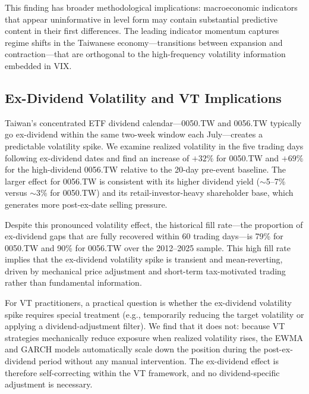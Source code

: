 This finding has broader methodological implications: macroeconomic indicators that appear uninformative in level form may contain substantial predictive content in their first differences. The leading indicator momentum captures regime shifts in the Taiwanese economy---transitions between expansion and contraction---that are orthogonal to the high-frequency volatility information embedded in VIX.

\subsection{Ex-Dividend Volatility and VT Implications}
\label{sec:exdiv}

Taiwan's concentrated ETF dividend calendar---0050.TW and 0056.TW typically go ex-dividend within the same two-week window each July---creates a predictable volatility spike. We examine realized volatility in the five trading days following ex-dividend dates and find an increase of $+32\%$ for 0050.TW and $+69\%$ for the high-dividend 0056.TW relative to the 20-day pre-event baseline. The larger effect for 0056.TW is consistent with its higher dividend yield ($\sim$5--7\% versus $\sim$3\% for 0050.TW) and its retail-investor-heavy shareholder base, which generates more post-ex-date selling pressure.

Despite this pronounced volatility effect, the historical fill rate---the proportion of ex-dividend gaps that are fully recovered within 60 trading days---is 79\% for 0050.TW and 90\% for 0056.TW over the 2012--2025 sample. This high fill rate implies that the ex-dividend volatility spike is transient and mean-reverting, driven by mechanical price adjustment and short-term tax-motivated trading rather than fundamental information.

For VT practitioners, a practical question is whether the ex-dividend volatility spike requires special treatment (e.g., temporarily reducing the target volatility or applying a dividend-adjustment filter). We find that it does not: because VT strategies mechanically reduce exposure when realized volatility rises, the EWMA and GARCH models automatically scale down the position during the post-ex-dividend period without any manual intervention. The ex-dividend effect is therefore self-correcting within the VT framework, and no dividend-specific adjustment is necessary.



